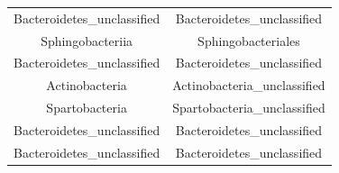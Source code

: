 \documentclass[]{article}
\begin{document}
\begin{longtable}[]{@{}cc@{}}
\begin{minipage}[t]{0.38\columnwidth}\centering\strut
Bacteroidetes\_unclassified\strut
\end{minipage} & \begin{minipage}[t]{0.44\columnwidth}\centering\strut
Bacteroidetes\_unclassified\strut
\end{minipage}\tabularnewline
\begin{minipage}[t]{0.38\columnwidth}\centering\strut
Sphingobacteriia\strut
\end{minipage} & \begin{minipage}[t]{0.44\columnwidth}\centering\strut
Sphingobacteriales\strut
\end{minipage}\tabularnewline
\begin{minipage}[t]{0.38\columnwidth}\centering\strut
Bacteroidetes\_unclassified\strut
\end{minipage} & \begin{minipage}[t]{0.44\columnwidth}\centering\strut
Bacteroidetes\_unclassified\strut
\end{minipage}\tabularnewline
\begin{minipage}[t]{0.38\columnwidth}\centering\strut
Actinobacteria\strut
\end{minipage} & \begin{minipage}[t]{0.44\columnwidth}\centering\strut
Actinobacteria\_unclassified\strut
\end{minipage}\tabularnewline
\begin{minipage}[t]{0.38\columnwidth}\centering\strut
Spartobacteria\strut
\end{minipage} & \begin{minipage}[t]{0.44\columnwidth}\centering\strut
Spartobacteria\_unclassified\strut
\end{minipage}\tabularnewline
\begin{minipage}[t]{0.38\columnwidth}\centering\strut
Bacteroidetes\_unclassified\strut
\end{minipage} & \begin{minipage}[t]{0.44\columnwidth}\centering\strut
Bacteroidetes\_unclassified\strut
\end{minipage}\tabularnewline
\begin{minipage}[t]{0.38\columnwidth}\centering\strut
Bacteroidetes\_unclassified\strut
\end{minipage} & \begin{minipage}[t]{0.44\columnwidth}\centering\strut
Bacteroidetes\_unclassified\strut
\end{minipage}\tabularnewline

\end{longtable}
\end{document}
